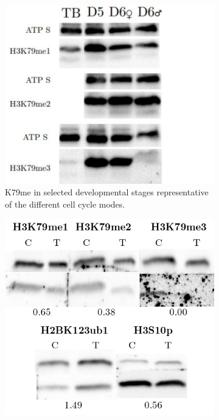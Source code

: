 \documentclass[11pt,twoside,a4paper]{report}
\begin{document}
	
	\begin{figure}
		\centering
		\begin{subfigure}{.5\textwidth}
			\centering
			\includegraphics[width=1\linewidth]{pngs/K79me_WT.png}
			\caption{K79me in selected developmental stages representative of the different cell cycle modes.}
		\end{subfigure}%
		\begin{subfigure}{.5\textwidth}
			\centering
			\includegraphics[width=1\linewidth]{pngs/TB_Dot1_in.png}

\end{subfigure}
\end{figure}
\end{document}
